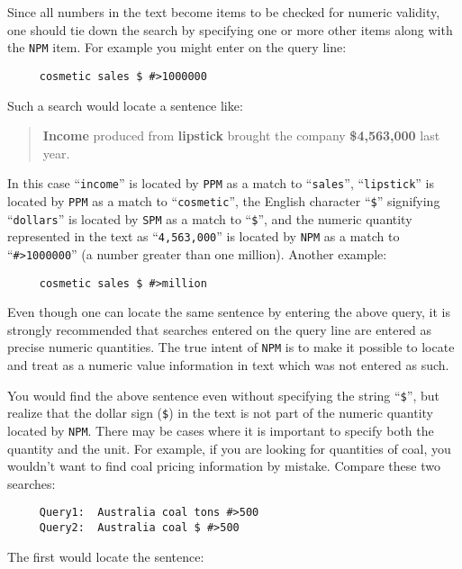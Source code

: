 Since all numbers in the text become items to be checked for numeric
validity, one should tie down the search by specifying one or more
other items along with the \verb`NPM` item.  For example you might
enter on the query line:

\begin{verbatim}
     cosmetic sales $ #>1000000
\end{verbatim}

Such a search would locate a sentence like:

\begin{quote}
     {\bf Income} produced from {\bf lipstick} brought the company
     {\bf \$}{\bf 4,563,000} last year.
\end{quote}

In this case ``\verb`income`'' is located by \verb`PPM` as a match to
``\verb`sales`'', ``\verb`lipstick`'' is located by \verb`PPM` as a
match to ``\verb`cosmetic`'', the English character ``\verb`$`''
signifying ``\verb`dollars`'' is located by \verb`SPM` as a match to
``\verb`$`'', and the numeric quantity represented in the text as
``\verb`4,563,000`'' is located by \verb`NPM` as a match to
``\verb`#>1000000`'' (a number greater than one million).  Another
example:

\begin{verbatim}
     cosmetic sales $ #>million
\end{verbatim}

Even though one can locate the same sentence by entering the above
query, it is strongly recommended that searches entered on the query
line are entered as precise numeric quantities.  The true intent of
\verb`NPM` is to make it possible to locate and treat as a numeric
value information in text which was not entered as such.

You would find the above sentence even without specifying the string
``\verb`$`'', but realize that the dollar sign (\verb`$`) in the text
is not part of the numeric quantity located by \verb`NPM`.  There may
be cases where it is important to specify both the quantity and the
unit.  For example, if you are looking for quantities of coal, you
wouldn't want to find coal pricing information by mistake.  Compare
these two searches:

\begin{verbatim}
     Query1:  Australia coal tons #>500
     Query2:  Australia coal $ #>500
\end{verbatim}

The first would locate the sentence:


